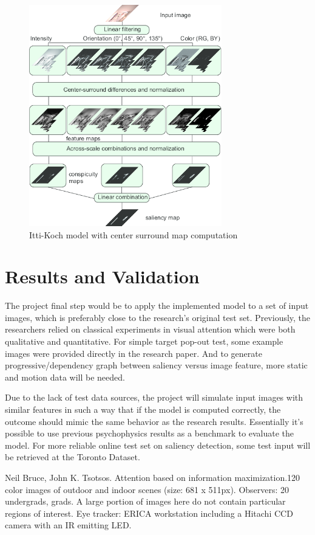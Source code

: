 \documentclass[conference]{IEEEtran}
\begin{document}
\begin{figure}[h]
    \centering
    \includegraphics[width=3.3in]{itti.png}
    \caption{Itti-Koch model with center surround map computation}
    \label{fig:itti}
\end{figure}
 
\section{Results and Validation}
The project final step would be to apply the implemented model to a set of input images, which is preferably close to the research’s original test set. Previously, the researchers relied on classical experiments in visual attention which were both qualitative and quantitative. For simple target pop-out test, some example images were provided directly in the research paper. And to generate progressive/dependency graph between saliency versus image feature, more static and motion data will be needed. 

Due to the lack of test data sources, the project will simulate input images with similar features in such a way that if the model is computed correctly, the outcome should mimic the same behavior as the research results. Essentially it’s possible to use previous psychophysics results as a benchmark to evaluate the model. For more reliable online test set on saliency detection, some test input will be retrieved at the Toronto Dataset.

Neil Bruce, John K. Tsotsos. Attention based on information maximization.120 color images of outdoor and indoor scenes (size: 681 x 511px). Observers: 20 undergrads, grads. A large portion of images here do not contain particular regions of interest. Eye tracker: ERICA workstation including a Hitachi CCD camera with an IR emitting LED.
\end{document}
